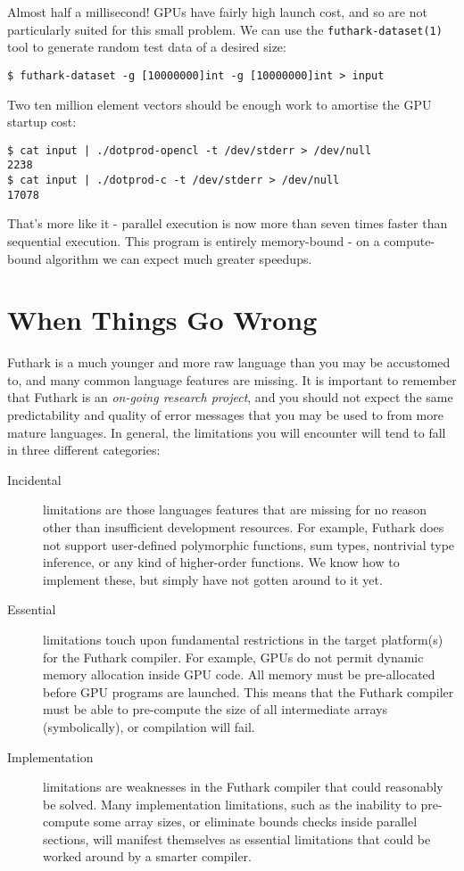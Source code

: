 \documentclass[11pt]{book}
\begin{document}
Almost half a millisecond!  GPUs have fairly high launch cost, and so
are not particularly suited for this small problem.  We can use the
\texttt{futhark-dataset(1)} tool to generate random test data of a
desired size:

\begin{verbatim}
$ futhark-dataset -g [10000000]int -g [10000000]int > input
\end{verbatim}

Two ten million element vectors should be enough work to amortise the
GPU startup cost:

\begin{verbatim}
$ cat input | ./dotprod-opencl -t /dev/stderr > /dev/null
2238
$ cat input | ./dotprod-c -t /dev/stderr > /dev/null
17078
\end{verbatim}

That's more like it - parallel execution is now more than seven times
faster than sequential execution.  This program is entirely
memory-bound - on a compute-bound algorithm we can expect much greater
speedups.

\section{When Things Go Wrong}

Futhark is a much younger and more raw language than you may be
accustomed to, and many common language features are missing.  It is
important to remember that Futhark is an \textit{on-going research
  project}, and you should not expect the same predictability and
quality of error messages that you may be used to from more mature
languages.  In general, the limitations you will encounter will tend
to fall in three different categories:

\begin{description}
\item[Incidental] limitations are those languages features that are
  missing for no reason other than insufficient development resources.
  For example, Futhark does not support user-defined polymorphic
  functions, sum types, nontrivial type inference, or any kind of
  higher-order functions.  We know how to implement these, but simply
  have not gotten around to it yet.

\item[Essential] limitations touch upon fundamental restrictions in
  the target platform(s) for the Futhark compiler.  For example, GPUs
  do not permit dynamic memory allocation inside GPU code.  All memory
  must be pre-allocated before GPU programs are launched.  This means
  that the Futhark compiler must be able to pre-compute the size of
  all intermediate arrays (symbolically), or compilation will fail.

\item[Implementation] limitations are weaknesses in the Futhark
  compiler that could reasonably be solved.  Many implementation
  limitations, such as the inability to pre-compute some array sizes,
  or eliminate bounds checks inside parallel sections, will manifest
  themselves as essential limitations that could be worked around by a
  smarter compiler.
\end{description}
\end{document}

